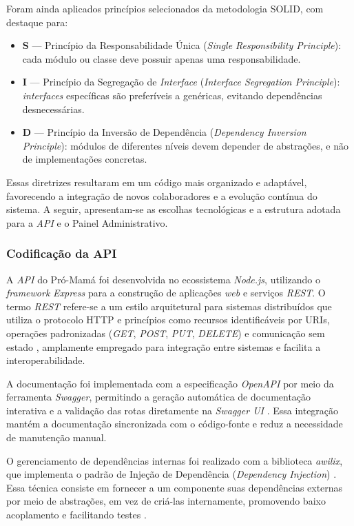 Foram ainda aplicados princípios selecionados da metodologia SOLID, com destaque para:
\begin{itemize}
    \item \textbf{S} — Princípio da Responsabilidade Única (\emph{Single Responsibility Principle}): cada módulo ou classe deve possuir apenas uma responsabilidade.
    \item \textbf{I} — Princípio da Segregação de \emph{Interface} (\emph{Interface Segregation Principle}): \emph{interfaces} específicas são preferíveis a genéricas, evitando dependências desnecessárias.
    \item \textbf{D} — Princípio da Inversão de Dependência (\emph{Dependency Inversion Principle}): módulos de diferentes níveis devem depender de abstrações, e não de implementações concretas.
\end{itemize}

Essas diretrizes resultaram em um código mais organizado e adaptável, favorecendo a integração de novos colaboradores e a evolução contínua do sistema. A seguir, apresentam-se as escolhas tecnológicas e a estrutura adotada para a \emph{API} e o Painel Administrativo.

\subsubsection{Codificação da API}

A \emph{API} do Pró-Mamá foi desenvolvida no ecossistema \emph{Node.js}, utilizando o \emph{framework} \emph{Express} para a construção de aplicações \emph{web} e serviços \emph{REST}. O termo \emph{REST} refere-se a um estilo arquitetural para sistemas distribuídos que utiliza o protocolo HTTP e princípios como recursos identificáveis por URIs, operações padronizadas (\emph{GET}, \emph{POST}, \emph{PUT}, \emph{DELETE}) e comunicação sem estado \cite{restibm}, amplamente empregado para integração entre sistemas e facilita a interoperabilidade.

A documentação foi implementada com a especificação \emph{OpenAPI} por meio da ferramenta \emph{Swagger}, permitindo a geração automática de documentação interativa e a validação das rotas diretamente na \emph{Swagger UI} \cite{swaggeropenapi}. Essa integração mantém a documentação sincronizada com o código-fonte e reduz a necessidade de manutenção manual.

O gerenciamento de dependências internas foi realizado com a biblioteca \emph{awilix}, que implementa o padrão de Injeção de Dependência (\emph{Dependency Injection}) \cite{awilixdocs}. Essa técnica consiste em fornecer a um componente suas dependências externas por meio de abstrações, em vez de criá-las internamente, promovendo baixo acoplamento e facilitando testes \cite{dimartinfowler}.

